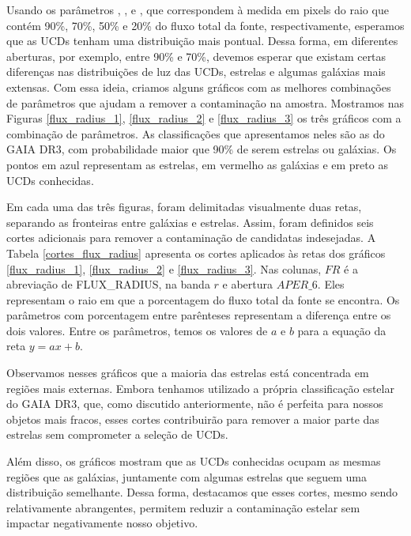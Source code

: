 {\sloppy
Usando os parâmetros , ,  e , que correspondem à medida em pixels do raio que contém 90\%, 70\%, 50\% e 20\% do fluxo total da fonte, respectivamente, esperamos que as UCDs tenham uma distribuição mais pontual. Dessa forma, em diferentes aberturas, por exemplo, entre 90\% e 70\%, devemos esperar que existam certas diferenças nas distribuições de luz das UCDs, estrelas e algumas galáxias mais extensas. Com essa ideia, criamos alguns gráficos com as melhores combinações de parâmetros que ajudam a remover a contaminação na amostra. Mostramos nas Figuras \ref{flux_radius_1}, \ref{flux_radius_2} e \ref{flux_radius_3} os três gráficos com a combinação de parâmetros. As classificações que apresentamos neles são as do GAIA DR3, com probabilidade maior que 90\% de serem estrelas ou galáxias. Os pontos em azul representam as estrelas, em vermelho as galáxias e em preto as UCDs conhecidas.}

Em cada uma das três figuras, foram delimitadas visualmente duas retas, separando as fronteiras entre galáxias e estrelas. Assim, foram definidos seis cortes adicionais para remover a contaminação de candidatas indesejadas. A Tabela \ref{cortes_flux_radius} apresenta os cortes aplicados às retas dos gráficos \ref{flux_radius_1}, \ref{flux_radius_2} e \ref{flux_radius_3}. Nas colunas, $FR$ é a abreviação de FLUX\_RADIUS, na banda $r$ e abertura $APER\_6$. Eles representam o raio em que a porcentagem do fluxo total da fonte se encontra. Os parâmetros com porcentagem entre parênteses representam a diferença entre os dois valores. Entre os parâmetros, temos os valores de $a$ e $b$ para a equação da reta $y = ax + b$. 

Observamos nesses gráficos que a maioria das estrelas está concentrada em regiões mais externas. Embora tenhamos utilizado a própria classificação estelar do GAIA DR3, que, como discutido anteriormente, não é perfeita para nossos objetos mais fracos, esses cortes contribuirão para remover a maior parte das estrelas sem comprometer a seleção de UCDs.

Além disso, os gráficos mostram que as UCDs conhecidas ocupam as mesmas regiões que as galáxias, juntamente com algumas estrelas que seguem uma distribuição semelhante. Dessa forma, destacamos que esses cortes, mesmo sendo relativamente abrangentes, permitem reduzir a contaminação estelar sem impactar negativamente nosso objetivo.

